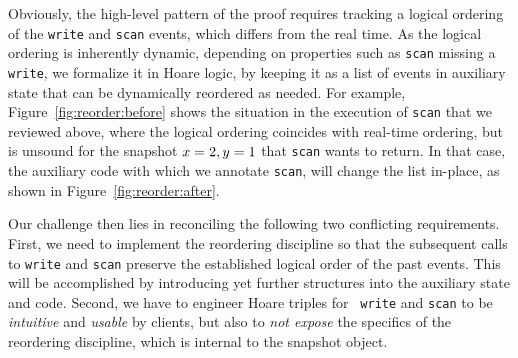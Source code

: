 

Obviously, the high-level pattern of the proof requires tracking a
logical ordering of the {\tt write} and {\tt scan} events, which
differs from the real time. As the logical ordering is inherently
dynamic, depending on properties such as {\tt scan} missing a {\tt
  write}, we formalize it in Hoare logic, by keeping it as a list of
events in auxiliary state that can be dynamically reordered as
needed. For example, Figure~\ref{fig:reorder:before} shows the
situation in the execution of {\tt scan} that we reviewed above, where
the logical ordering coincides with real-time ordering, but is unsound
for the snapshot $x=2, y=1$ that {\tt scan} wants to return. In that
case, the auxiliary code with which we annotate {\tt scan},
will change the list in-place, as shown in
Figure~\ref{fig:reorder:after}.

Our challenge then lies in reconciling the following two conflicting
requirements. First, we need to implement the reordering discipline so
that the subsequent calls to {\tt write} and {\tt scan} preserve the
established logical order of the past events. This will be
accomplished by introducing yet further structures into the auxiliary
state and code. Second, we have to engineer Hoare triples for {\tt
  write} and {\tt scan} to be \emph{intuitive} and \emph{usable} by
clients, but also to \emph{not expose} the specifics of the reordering
discipline, which is internal to the snapshot object. 



